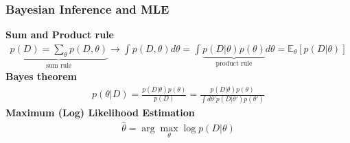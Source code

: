 \documentclass{beamer}
\begin{document}
\begin{frame}
\frametitle{Bayesian Inference and MLE}
\textbf{Sum and Product rule}
\begin{align}
\underbrace{p(D) = \sum_\theta p(D, \theta)}_{\text{sum rule}} \rightarrow \int p(D,\theta) d\theta = \int \underbrace{p(D|\theta) p(\theta)}_{\text{product rule}} d\theta = \mathbb{E}_\theta [p(D|\theta)]
\end{align}
\pause \textbf{Bayes theorem}
\begin{align}
p(\theta | D) = \frac{p(D|\theta) p(\theta)}{p(D)} =  \frac{p(D|\theta) p(\theta)}{\int d\theta' p(D|\theta') p(\theta')}
\end{align}
\pause \textbf{Maximum (Log) Likelihood Estimation}
\begin{align}
\hat{\theta} = \arg \underset{\theta}{\max} \log p(D|\theta)
\end{align}
\end{frame}
\end{document}
